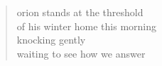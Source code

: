 \begin{verse}
orion stands at the threshold \\
of his winter home this morning \\
knocking gently \\
waiting to see how we answer
\end{verse}
